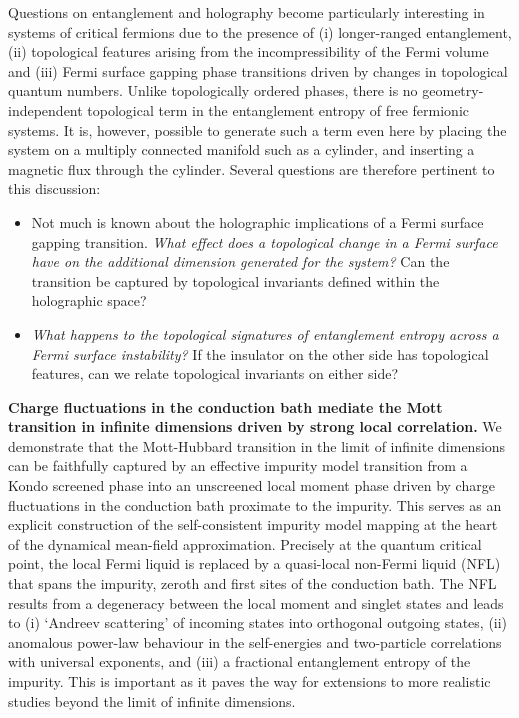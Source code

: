 Questions on entanglement and holography become particularly interesting in systems of critical fermions due to the presence of (i) longer-ranged entanglement, (ii) topological features arising from the incompressibility of the Fermi volume and (iii) Fermi surface gapping phase transitions driven by changes in topological quantum numbers. Unlike topologically ordered phases, there is no geometry-independent topological term in the entanglement entropy of free fermionic systems. It is, however, possible to generate such a term even here by placing the system on a multiply connected manifold such as a cylinder, and inserting a magnetic flux through the cylinder. Several questions are therefore pertinent to this discussion:
\begin{itemize}
	\item Not much is known about the holographic implications of a Fermi surface gapping transition. {\it What effect does a topological change in a Fermi surface have on the additional dimension generated for the system? } Can the transition be captured by topological invariants defined within the holographic space?
	\item {\it What happens to the topological signatures of entanglement entropy across a Fermi surface instability?} If the insulator on the other side has topological features, can we relate topological invariants on either side?
\end{itemize}

\vspace{1em}

{\bf Charge fluctuations in the conduction bath mediate the Mott transition in infinite dimensions driven by strong local correlation.} We demonstrate that the Mott-Hubbard transition in the limit of infinite dimensions can be faithfully captured by an effective impurity model transition from a Kondo screened phase into an unscreened local moment phase driven by charge fluctuations in the conduction bath proximate to the impurity. This serves as an explicit construction of the self-consistent impurity model mapping at the heart of the dynamical mean-field approximation. Precisely at the quantum critical point, the local Fermi liquid is replaced by a quasi-local non-Fermi liquid (NFL) that spans the impurity, zeroth and first sites of the conduction bath. The NFL results from a degeneracy between the local moment and singlet states and leads to (i) ‘Andreev scattering’ of incoming states into orthogonal outgoing states, (ii) anomalous power-law behaviour in the self-energies and two-particle correlations with universal exponents, and (iii) a fractional entanglement entropy of the impurity. This is important as it paves the way for extensions to more realistic studies beyond the limit of infinite dimensions.

